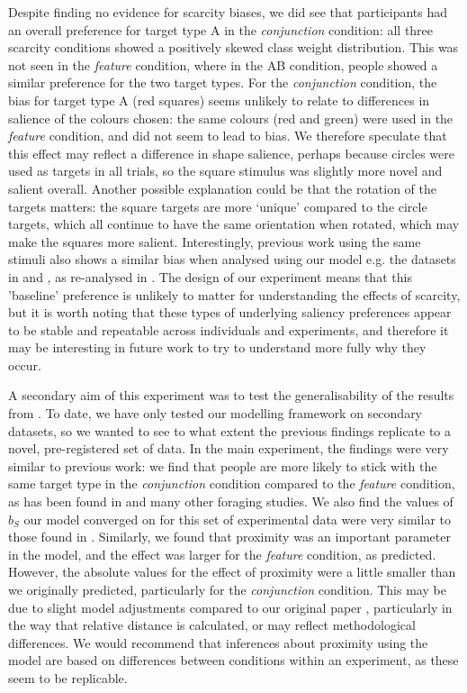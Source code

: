 \documentclass[12pt]{article}
\begin{document}
Despite finding no evidence for scarcity biases, we did see that participants had an overall preference for target type A in the \textit{conjunction} condition: all three scarcity conditions showed a positively skewed class weight distribution. This was not seen in the \textit{feature} condition, where in the AB condition, people showed a similar preference for the two target types. For the \textit{conjunction} condition, the bias for target type A (red squares) seems unlikely to relate to differences in salience of the colours chosen: the same colours (red and green) were used in the \textit{feature} condition, and did not seem to lead to bias. We therefore speculate that this effect may reflect a difference in shape salience, perhaps because circles were used as targets in all trials, so the square stimulus was slightly more novel and salient overall. Another possible explanation could be that the rotation of the targets matters: the square targets are more `unique' compared to the circle targets, which all continue to have the same orientation when rotated, which may make the squares more salient. Interestingly, previous work using the same stimuli also shows a similar bias when analysed using our model e.g. the datasets in \cite{clarke2022stable} and \cite{kristjansson2014common}, as re-analysed in \cite{clarke2022foraging}. The design of our experiment means that this 'baseline' preference is unlikely to matter for understanding the effects of scarcity, but it is worth noting that these types of underlying saliency preferences appear to be stable and repeatable across individuals and experiments, and therefore it may be interesting in future work to try to understand more fully why they occur.

A secondary aim of this experiment was to test the generalisability of the results from \cite{clarke2022foraging}. To date, we have only tested our modelling framework on secondary datasets, so we wanted to see to what extent the previous findings replicate to a novel, pre-registered set of data. In the main experiment, the findings were very similar to previous work: we find that people are more likely to stick with the same target type in the \textit{conjunction} condition compared to the \textit{feature} condition, as has been found in \citep{kristjansson2014common, clarke2022stable} and many other foraging studies. We also find the values of $b_S$ our model converged on for this set of experimental data were very similar to those found in \citep{clarke2022foraging}. Similarly, we found that proximity was an important parameter in the model, and the effect was larger for the \textit{feature} condition, as predicted. However, the absolute values for the effect of proximity were a little smaller than we originally predicted, particularly for the \textit{conjunction} condition. This may be due to slight model adjustments compared to our original paper \citep{clarke2022foraging}, particularly in the way that relative distance is calculated, or may  reflect methodological differences. We would recommend that inferences about proximity using the model are based on differences between conditions within an experiment, as these seem to be replicable.
\end{document}
